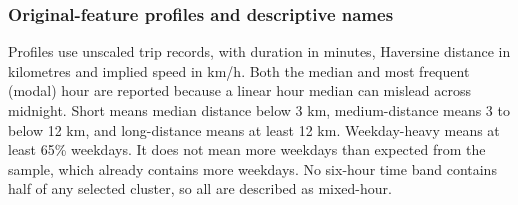 \documentclass{article}
\begin{document}
\subsubsection{Original-feature profiles and descriptive names}

Profiles use unscaled trip records, with duration in minutes, Haversine
distance in kilometres and implied speed in km/h. Both the median and most
frequent (modal) hour are reported because a linear hour median can mislead across
midnight. Short means median distance below 3 km, medium-distance means
3 to below 12 km, and long-distance means at least 12 km. Weekday-heavy
means at least 65\% weekdays. It does not mean more weekdays than expected
from the sample, which already contains more weekdays. No six-hour time band contains half of
any selected cluster, so all are described as mixed-hour.

\begin{table}[H]
  \caption{Original-unit profiles for every cluster and noise group (-1).
  Hours are median/mode; Wd and We denote weekday and weekend percentages.}
  \centering
\end{table}
\end{document}
